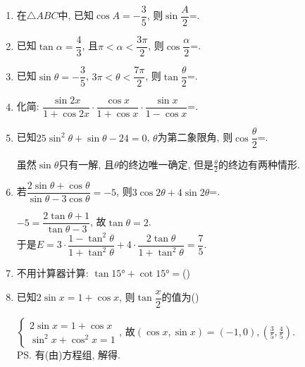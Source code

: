 \begin{enumerate}
\item 在$\triangle{ABC}$中, 已知$\cos{A}=-\dfrac{3}{5}$, 则$\sin\dfrac{A}{2}$=. 

\item 已知$\tan\alpha=\dfrac{4}{3}$, 且$\pi<\alpha<\dfrac{3\pi}{2}$, 则$\cos\dfrac{\alpha}{2}$=. 

\item 已知$\sin\theta=-\dfrac{3}{5}$, $3\pi<\theta<\dfrac{7\pi}{2}$, 则$\tan\dfrac{\theta}{2}$=. 

\item 化简: $\dfrac{\sin2x}{1+\cos2x}\cdot\dfrac{\cos{x}}{1+\cos{x}}\cdot\dfrac{\sin{x}}{1-\cos{x}}$=. 

\item 已知$25\sin^2\theta+\sin\theta-24=0$, $\theta$为第二象限角, 则$\cos\dfrac{\theta}{2}$=. 
\begin{jieda}
虽然$\sin\theta$只有一解, 且$\theta$的终边唯一确定, 但是$\frac{\theta}{2}$的终边有两种情形. 
\end{jieda}

\item 若$\dfrac{2\sin\theta+\cos\theta}{\sin\theta-3\cos\theta}=-5$, 则$3\cos2\theta+4\sin2\theta$=. 
\begin{jieda}
$-5=\dfrac{2\tan\theta+1}{\tan\theta-3}$, 故$\tan\theta=2$. \\
于是$E=3\cdot\dfrac{1-\tan^2\theta}{1+\tan^2\theta}+4\cdot\dfrac{2\tan\theta}{1+\tan^2\theta}=\dfrac{7}{5}$. 
\end{jieda}

\item 不用计算器计算: $\tan\ang{15}+\cot\ang{15}=$\dotfill()

\item 已知$2\sin{x}=1+\cos{x}$, 则$\tan\dfrac{x}{2}$的值为\dotfill()
\begin{jieda}
$\begin{cases}
2\sin{x}=1+\cos{x}\\
\sin^2x+\cos^2x=1
\end{cases}$, 
故$(\cos{x},\sin{x})=(-1,0),(\frac{3}{5},\frac{4}{5})$. \\
\ps 有(由)方程组, 解得. 
\end{jieda}



\end{enumerate}
